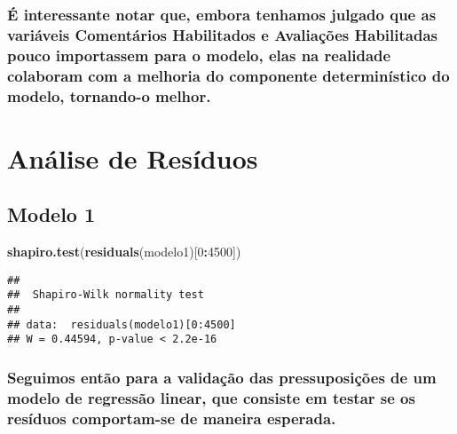 \documentclass[]{article}
\newenvironment{Shaded}{\begin{snugshade}}{\end{snugshade}}
\newcommand{\DecValTok}[1]{\textcolor[rgb]{0.00,0.00,0.81}{#1}}
\newcommand{\KeywordTok}[1]{\textcolor[rgb]{0.13,0.29,0.53}{\textbf{#1}}}
\newcommand{\NormalTok}[1]{#1}
\newcommand{\OperatorTok}[1]{\textcolor[rgb]{0.81,0.36,0.00}{\textbf{#1}}}
\begin{document}
\hypertarget{e-interessante-notar-que-embora-tenhamos-julgado-que-as-variaveis-comentarios-habilitados-e-avaliacoes-habilitadas-pouco-importassem-para-o-modelo-elas-na-realidade-colaboram-com-a-melhoria-do-componente-deterministico-do-modelo-tornando-o-melhor.}{%
\subsubsection{É interessante notar que, embora tenhamos julgado que as
variáveis Comentários Habilitados e Avaliações Habilitadas pouco
importassem para o modelo, elas na realidade colaboram com a melhoria do
componente determinístico do modelo, tornando-o
melhor.}\label{e-interessante-notar-que-embora-tenhamos-julgado-que-as-variaveis-comentarios-habilitados-e-avaliacoes-habilitadas-pouco-importassem-para-o-modelo-elas-na-realidade-colaboram-com-a-melhoria-do-componente-deterministico-do-modelo-tornando-o-melhor.}}

\hypertarget{analise-de-residuos}{%
\section{Análise de Resíduos}\label{analise-de-residuos}}

\hypertarget{modelo-1-1}{%
\subsection{Modelo 1}\label{modelo-1-1}}

\begin{Shaded}
\begin{Highlighting}[]
  \KeywordTok{shapiro.test}\NormalTok{(}\KeywordTok{residuals}\NormalTok{(modelo1)[}\DecValTok{0}\OperatorTok{:}\DecValTok{4500}\NormalTok{])}
\end{Highlighting}
\end{Shaded}

\begin{verbatim}
## 
##  Shapiro-Wilk normality test
## 
## data:  residuals(modelo1)[0:4500]
## W = 0.44594, p-value < 2.2e-16
\end{verbatim}

\hypertarget{seguimos-entao-para-a-validacao-das-pressuposicoes-de-um-modelo-de-regressao-linear-que-consiste-em-testar-se-os-residuos-comportam-se-de-maneira-esperada.}{%
\subsubsection{Seguimos então para a validação das pressuposições de um
modelo de regressão linear, que consiste em testar se os resíduos
comportam-se de maneira
esperada.}\label{seguimos-entao-para-a-validacao-das-pressuposicoes-de-um-modelo-de-regressao-linear-que-consiste-em-testar-se-os-residuos-comportam-se-de-maneira-esperada.}}
\end{document}
